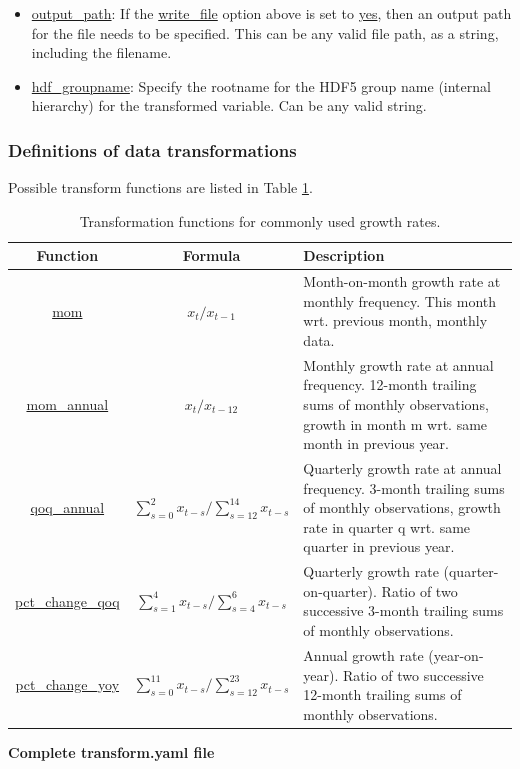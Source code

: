 \documentclass[10pt,a4paper]{article}
\begin{document}
\begin{itemize}
\item \url{output_path}: If the \url{write_file} option above is set to \url{yes}, then an output path for the file needs to be specified.
This can be any valid file path, as a string, including the filename.

\item \url{hdf_groupname}: Specify the rootname for the HDF5 group name (internal hierarchy) for the transformed variable. Can be any valid string.
\end{itemize}

\subsubsection{Definitions of data transformations}
Possible transform functions are listed in Table \ref{Table: Transformation}.

\begin{table}[hbt!]
\label{Table: Transformation}
\begin{tabular}{|c|c|l|}
\hline \hline 
Function & Formula & Description\\
\hline 
\url{mom} & $x_{t}/x_{t-1}$ &  \parbox{7cm}{Month-on-month growth rate at monthly frequency. This month wrt. previous month, monthly data.} \\ 
\hline 
\url{mom_annual} & $x_{t}/x_{t-12}$ & \parbox{7cm}{Monthly growth rate at annual frequency. 12-month trailing sums of monthly observations, growth in month m wrt. same month in previous year.} \\ 
\hline 
\url{qoq_annual} & $\sum_{s=0}^2 x_{t-s}/\sum_{s=12}^{14} x_{t-s}$ & \parbox{7cm}{Quarterly growth rate at annual frequency. 3-month trailing sums of monthly observations, growth rate in quarter q wrt. same quarter in previous year.} \\ 
\hline 
\url{pct_change_qoq} & $\sum_{s=1}^{4} x_{t-s}/\sum_{s=4}^{6} x_{t-s}$ & \parbox{7cm}{Quarterly growth rate (quarter-on-quarter). Ratio of two successive 3-month trailing sums of monthly observations.} \\ 
\hline 
\url{pct_change_yoy} & $\sum_{s=0}^{11} x_{t-s}/\sum_{s=12}^{23} x_{t-s}$ & \parbox{7cm}{Annual growth rate (year-on-year). Ratio of two successive 12-month trailing sums of monthly observations.} \\ 
\hline 
\end{tabular} 
\caption{Transformation functions for commonly used growth rates.}
\end{table}


\bigskip
\textbf{Complete transform.yaml file}
\end{document}
